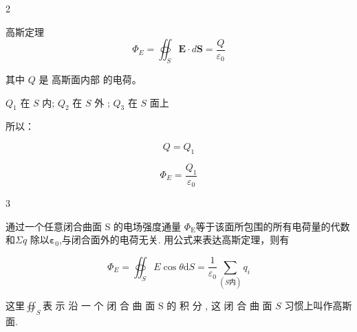 \documentclass{article}
\begin{document}
2

高斯定理
$$\Phi_E = \oiint_S \mathbf{E} \cdot d\mathbf{S} = \frac{Q}{\varepsilon_0}$$  

其中 $ Q $ 是 高斯面内部 的电荷。  

$ Q_1 $ 在 $ S $ 内;
$ Q_2 $ 在 $ S $ 外 ;
$ Q_3 $ 在 $ S $ 面上 

所以：
  
$$Q = Q_1$$

$$\Phi_E = \frac{Q_1}{\varepsilon_0}$$  





\newpage

3

通过一个任意闭合曲面 S 的电场强度通量 $\Phi_\mathrm{E}$等于该面所包围的所有电荷量的代数和$\Sigma q$ 除以$\boldsymbol{\varepsilon}_0$,与闭合面外的电荷无关.
用公式来表达高斯定理，则有

$$\Phi_E=\oiint_SE\cos\theta\mathrm{d}S=\frac1{\varepsilon_0}\sum_{(S\text{内})}q_i$$

这里$\oiint _S$表 示 沿 一 个 闭 合 曲 面  S 的 积 分 , 这 闭 合 曲 面  $S$ 习惯上叫作高斯面.
\end{document}
